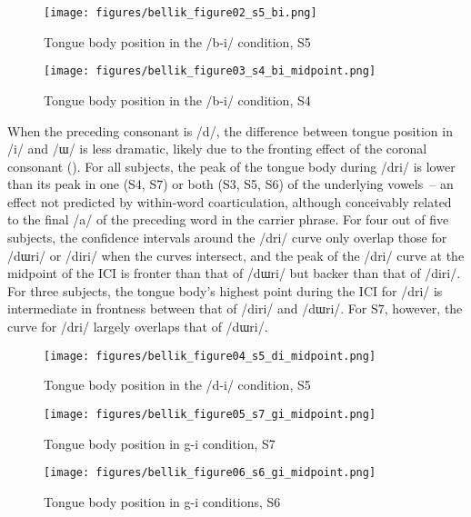 \documentclass[output=paper,colorlinks,citecolor=brown]{langscibook}
\begin{document}
\begin{figure}
\caption{Tongue body position in the /b-i/ condition, S5}
\texttt{[image: figures/bellik\_figure02\_s5\_bi.png]}
\label{b1s5}
\end{figure}


\begin{figure}
\caption{Tongue body position in the /b-i/ condition, S4}
\texttt{[image: figures/bellik\_figure03\_s4\_bi\_midpoint.png]}
\label{b1s4}
\end{figure}

When the preceding consonant is /d/, the difference between tongue position in /i/ and /ɯ/ is less dramatic, likely due to the fronting effect of the coronal consonant (). For all subjects, the peak of the tongue body during /dri/ is lower than its peak in one (S4, S7) or both (S3, S5, S6) of the underlying vowels~-- an effect not predicted by within-word coarticulation, although conceivably related to the final /a/ of the preceding word in the carrier phrase. For four out of five subjects, the confidence intervals around the /dri/ curve only overlap those for /dɯri/ or /diri/ when the curves intersect, and the peak of the /dri/ curve at the midpoint of the ICI is fronter than that of /dɯri/ but backer than that of /diri/. For three subjects, the tongue body's highest point during the ICI for /dri/ is intermediate in frontness between that of /diri/ and /dɯri/. For S7, however, the curve for /dri/ largely overlaps that of /dɯri/.

\begin{figure}
\caption{Tongue body position in the /d-i/ condition, S5}
\texttt{[image: figures/bellik\_figure04\_s5\_di\_midpoint.png]}
\label{d1s5}
\end{figure}

\newpage

\begin{figure}[b!]
\caption{Tongue body position in g-i condition, S7}
\texttt{[image: figures/bellik\_figure05\_s7\_gi\_midpoint.png]}
\label{g1s7}
\end{figure}


\begin{figure}[b!]
\caption{Tongue body position in g-i conditions, S6}
\texttt{[image: figures/bellik\_figure06\_s6\_gi\_midpoint.png]}
\label{g1s6}
\end{figure}
\end{document}
